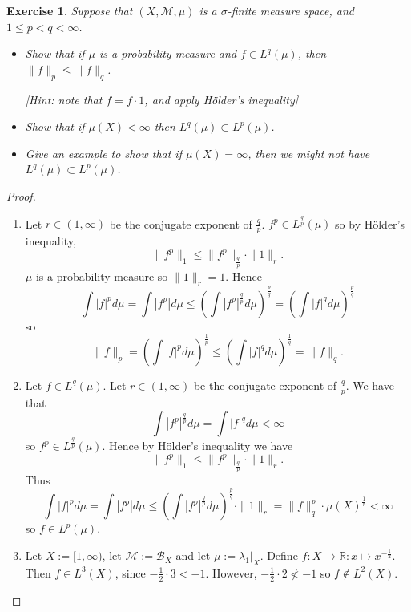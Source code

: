 \documentclass{article}
\newtheorem{exercise}[theorem]{Exercise}
\begin{document}
\begin{exercise}
Suppose that $(X, \mathcal{M}, \mu)$ is a $\sigma$-finite measure space, and $1 \leq p < q < \infty$.
\begin{itemize}
    \item[(a)] Show that if $\mu$ is a probability measure and $f \in L^q(\mu)$, then $\|f\|_p \leq \|f\|_q$.

    \textit{[Hint: note that $f = f \cdot 1$, and apply Hölder’s inequality]}
    
    \item[(b)] Show that if $\mu(X) < \infty$ then $L^q(\mu) \subset L^p(\mu)$.
    
    \item[(c)] Give an example to show that if $\mu(X) = \infty$, then we might not have $L^q(\mu) \subset L^p(\mu)$.
\end{itemize}
\end{exercise}
\begin{proof}
\begin{enumerate}
    \item[(a)] Let $r\in(1,\infty)$ be the conjugate exponent of $\frac{q}{p}$. $f^p\in L^\frac{q}{p}(\mu)$ so by H\"{o}lder's inequality,\[\|f^p\|_1\leq\|f^p\|_\frac{q}{p}\cdot\|1\|_r.\] $\mu$ is a probability measure so $\|1\|_r=1$. Hence\[\int|f|^pd\mu=\int |f^p|d\mu\leq\left(\int|f^p|^\frac{q}{p}d\mu\right)^\frac{p}{q}=\left(\int|f|^qd\mu\right)^\frac{p}{q}\]so\[\|f\|_p=\left(\int|f|^pd\mu\right)^\frac{1}{p}\leq\left(\int|f|^qd\mu\right)^\frac{1}{q}=\|f\|_q.\]
    \item[(b)] Let $f\in L^q(\mu)$. Let $r\in(1,\infty)$ be the conjugate exponent of $\frac{q}{p}$. We have that \[\int |f^p|^\frac{q}{p}d\mu=\int |f|^qd\mu<\infty\] so $f^p\in L^\frac{q}{p}(\mu)$. Hence by H\"{o}lder's inequality we have\[\|f^p\|_1\leq\|f^p\|_\frac{q}{p}\cdot\|1\|_r.\] Thus\[\int |f|^pd\mu=\int|f^p|d\mu\leq\left(\int|f^p|^\frac{q}{p}d\mu\right)^\frac{p}{q}\cdot\|1\|_r=\|f\|_q^p\cdot\mu(X)^\frac{1}{r}<\infty\] so $f\in L^p(\mu)$.
    \item[(c)] Let $X:=[1,\infty)$, let $\mathcal{M}:=\mathcal{B}_X$ and let $\mu:=\lambda_1|_X$. Define $f:X\to\mathbb{R}:x\mapsto x^{-\frac{1}{2}}$. Then $f\in L^3(X)$, since $-\frac{1}{2}\cdot 3<-1$. However, $-\frac{1}{2}\cdot 2\not <-1$ so $f\not\in L^2(X)$.
\end{enumerate}
\end{proof}
\end{document}
